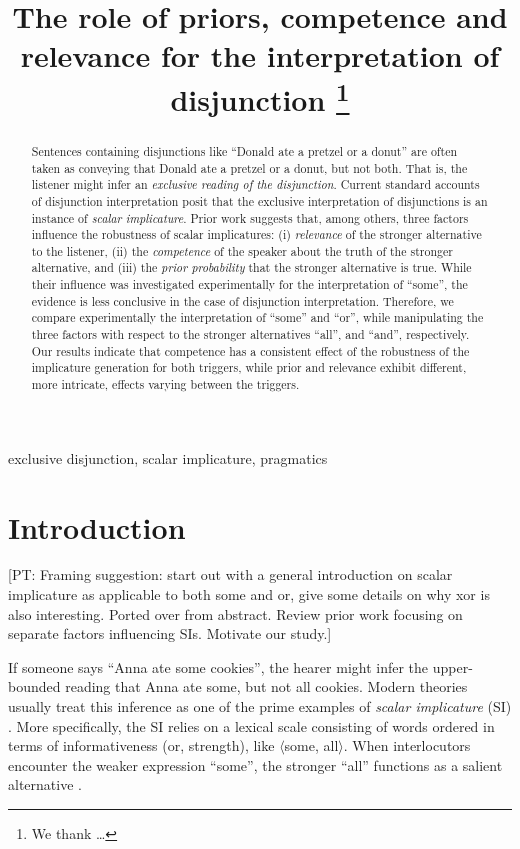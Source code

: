 \documentclass{sp}
\title[Exclusive disjunction]{The role of priors, competence and relevance for the interpretation of disjunction%
  \thanks{We thank \ldots}}
\author[]{%
  \spauthor{Polina Tsvilodub \\ \institute{Institute}} \AND
  \spauthor{Bob van Tiel \\ \institute{Institute}} \AND
  \spauthor{Michael Franke \\ \institute{Department of Linguistics \\ University of Tübingen}}}
\newcommand{\pt}[1]{\textcolor{Cerulean}{[PT: #1]}}
\begin{document}
\maketitle

\begin{abstract}
  
  Sentences containing disjunctions like ``Donald ate a pretzel or a donut'' are often taken as conveying that Donald ate a pretzel or a donut, but not both. That is, the listener might infer an \textit{exclusive reading of the disjunction}. Current standard accounts of disjunction interpretation posit that the exclusive interpretation of disjunctions is an instance of \textit{scalar implicature}. Prior work suggests that, among others, three factors influence the robustness of scalar implicatures: (i) \textit{relevance} of the stronger alternative to the listener, (ii) the \textit{competence} of the speaker about the truth of the stronger alternative, and (iii) the \textit{prior probability} that the stronger alternative is true. While their influence was investigated experimentally for the interpretation of ``some'', the evidence is less conclusive in the case of disjunction interpretation. Therefore, we compare experimentally the interpretation of ``some'' and ``or'', while manipulating the three factors with respect to the stronger alternatives “all”, and “and”, respectively. Our results indicate that competence has a consistent effect of the robustness of the implicature generation for both triggers, while prior and relevance exhibit different, more intricate, effects varying between the triggers.
  
\end{abstract}

\begin{keywords}
 exclusive disjunction, scalar implicature, pragmatics
\end{keywords}

\section{Introduction}

\pt{Framing suggestion: start out with a general introduction on scalar implicature as applicable to both some and or,  give some details on why xor is also interesting. Ported over from abstract. Review prior work focusing on separate factors influencing SIs. Motivate our study.}

If someone says “Anna ate some cookies”, the hearer might infer the upper-bounded reading that Anna ate some, but not all cookies. Modern theories usually treat this inference as one of the prime examples of \textit{scalar implicature} (SI) \citep{horn1972semantic}. More specifically, the SI relies on a lexical scale consisting of words ordered in terms of informativeness (or, strength), like $\langle$some, all$\rangle$. When interlocutors encounter the weaker expression ``some'', the stronger ``all'' functions as a salient alternative \citep{matsumoto1995conversational}. 
\end{document}
